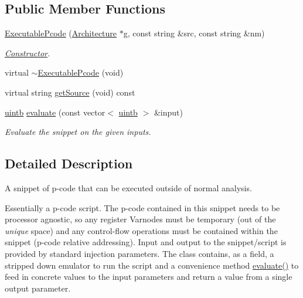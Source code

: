 \subsection*{Public Member Functions}
\begin{DoxyCompactItemize}
\item 
\mbox{\hyperlink{class_executable_pcode_adda3ecde2df23fa5ebea51e0f7ded106}{Executable\+Pcode}} (\mbox{\hyperlink{class_architecture}{Architecture}} $\ast$g, const string \&src, const string \&nm)
\begin{DoxyCompactList}\small\item\em \mbox{\hyperlink{class_constructor}{Constructor}}. \end{DoxyCompactList}\item 
virtual \mbox{\hyperlink{class_executable_pcode_a62c3040719edcdf18e784424f9404c7a}{$\sim$\+Executable\+Pcode}} (void)
\item 
virtual string \mbox{\hyperlink{class_executable_pcode_a778beba39ea7ee969febbfce992d6600}{get\+Source}} (void) const
\item 
\mbox{\hyperlink{types_8h_a2db313c5d32a12b01d26ac9b3bca178f}{uintb}} \mbox{\hyperlink{class_executable_pcode_a0ff39a9bb778d67df86b741a20739d75}{evaluate}} (const vector$<$ \mbox{\hyperlink{types_8h_a2db313c5d32a12b01d26ac9b3bca178f}{uintb}} $>$ \&input)
\begin{DoxyCompactList}\small\item\em Evaluate the snippet on the given inputs. \end{DoxyCompactList}\end{DoxyCompactItemize}


\subsection{Detailed Description}
A snippet of p-\/code that can be executed outside of normal analysis. 

Essentially a p-\/code script. The p-\/code contained in this snippet needs to be processor agnostic, so any register Varnodes must be temporary (out of the {\itshape unique} space) and any control-\/flow operations must be contained within the snippet (p-\/code relative addressing). Input and output to the snippet/script is provided by standard injection parameters. The class contains, as a field, a stripped down emulator to run the script and a convenience method \mbox{\hyperlink{class_executable_pcode_a0ff39a9bb778d67df86b741a20739d75}{evaluate()}} to feed in concrete values to the input parameters and return a value from a single output parameter. 

